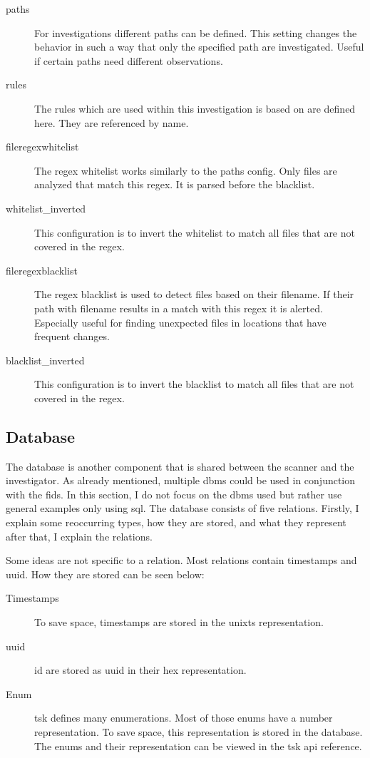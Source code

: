 \begin{description}
    \item [paths] For investigations different paths can be defined. This setting changes the behavior in such a way that only the specified path are investigated. Useful if certain paths need different observations.
    \item [rules] The rules which are used within this investigation is based on are defined here. They are referenced by name.
    \item [fileregexwhitelist] The \gls{regex} whitelist works similarly to the paths config. Only files are analyzed that match this \gls{regex}. It is parsed before the blacklist.
    \item [whitelist\_inverted] This configuration is to invert the whitelist to match all files that are not covered in the \gls{regex}.
    \item [fileregexblacklist] The \gls{regex} blacklist is used to detect files based on their filename. If their path with filename results in a match with this \gls{regex} it is alerted. Especially useful for finding unexpected files in locations that have frequent changes.
    \item [blacklist\_inverted] This configuration is to invert the blacklist to match all files that are not covered in the \gls{regex}.
\end{description}

\subsection{Database}
\label{sec:Database}

The database is another component that is shared between the scanner and the investigator. As already mentioned, multiple \gls{dbms} could be used in conjunction with the \gls{fids}. In this section, I do not focus on the \gls{dbms} used but rather use general examples only using \gls{sql}. The database consists of five relations. Firstly, I explain some reoccurring types, how they are stored, and what they represent after that, I explain the relations.

Some ideas are not specific to a relation. Most relations contain timestamps and \gls{uuid}. How they are stored can be seen below:

\begin{description}
	\item [Timestamps] To save space, timestamps are stored in the \gls{unixts} representation. 
	\item [\gls{uuid}] \gls{id} are stored as \gls{uuid} in their \gls{hex} representation. 
	\item [Enum] \gls{tsk} defines many enumerations. Most of those enums have a number representation. To save space, this representation is stored in the database. The enums and their representation can be viewed in the \gls{tsk} \gls{api} reference. \cite{tsk:file:header}
\end{description}

